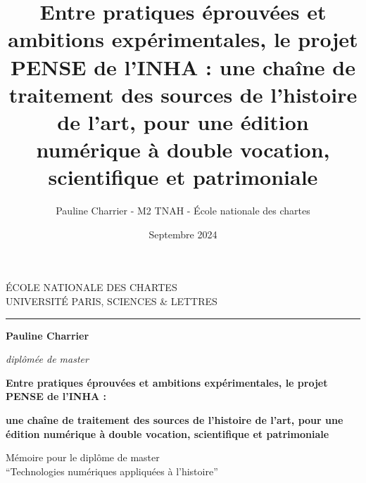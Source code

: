 \author{Pauline Charrier - M2 TNAH - École nationale des chartes}
\title{Entre pratiques éprouvées et ambitions expérimentales, le projet PENSE de l’INHA : une chaîne de traitement des sources de l’histoire de l’art, pour une édition numérique à double vocation, scientifique et patrimoniale}
\date{Septembre 2024}

	\begin{titlepage}
		\begin{center}
			
			\bigskip
			
			\begin{large}				
				ÉCOLE NATIONALE DES CHARTES\\
				UNIVERSITÉ PARIS, SCIENCES \& LETTRES
			\end{large}
			\begin{center}\rule{2cm}{0.02cm}\end{center}
			
			\bigskip
			\bigskip
			\bigskip
			\begin{Large}
				\textbf{Pauline Charrier}\\
			\end{Large}
			\begin{normalsize}
				\textit{diplômée de master}
			\end{normalsize}
			
			\bigskip
			\bigskip
			\bigskip
			
			\begin{Huge}
				\textbf{Entre pratiques éprouvées et ambitions expérimentales, le projet PENSE de l’INHA :}\\
			\end{Huge}
			\bigskip
			\bigskip
			\begin{LARGE}
				\textbf{une chaîne de traitement des sources de l’histoire de l’art, pour une édition numérique à double vocation, scientifique et patrimoniale}\\
			\end{LARGE}
			
			\bigskip
			\bigskip
			\bigskip
			\begin{large}
			\end{large}
			\vfill
			
			\begin{large}
				Mémoire 
				pour le diplôme de master \\
				\enquote{Technologies numériques appliquées à l'histoire} \\
			\end{large}
			
		\end{center}
	\end{titlepage}

	\thispagestyle{empty}	
	\cleardoublepage